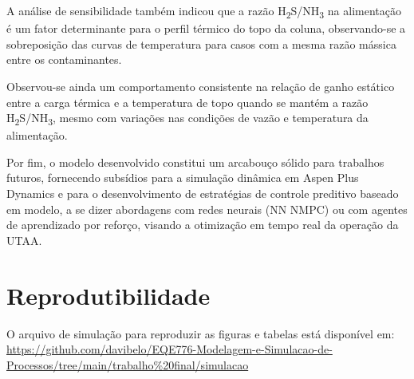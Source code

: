 \documentclass[10pt,a4paper]{article}
\begin{document}
A análise de sensibilidade também indicou que a razão H\textsubscript{2}S/NH\textsubscript{3} na alimentação é um fator determinante para o perfil térmico do topo da coluna, observando-se a sobreposição das curvas de temperatura para casos com a mesma razão mássica entre os contaminantes.

Observou-se ainda um comportamento consistente na relação de ganho estático entre a carga térmica e a temperatura de topo quando se mantém a razão H\textsubscript{2}S/NH\textsubscript{3}, mesmo com variações nas condições de vazão e temperatura da alimentação.

Por fim, o modelo desenvolvido constitui um arcabouço sólido para trabalhos futuros, fornecendo subsídios para a simulação dinâmica em Aspen Plus Dynamics e para o desenvolvimento de estratégias de controle preditivo baseado em modelo, a se dizer abordagens com redes neurais (NN NMPC) ou com agentes de aprendizado por reforço, visando a otimização em tempo real da operação da UTAA.

\appendix

\section{Reprodutibilidade}
O arquivo de simulação para reproduzir as figuras e tabelas está disponível em: \url{https://github.com/davibelo/EQE776-Modelagem-e-Simulacao-de-Processos/tree/main/trabalho%20final/simulacao}
\end{document}
